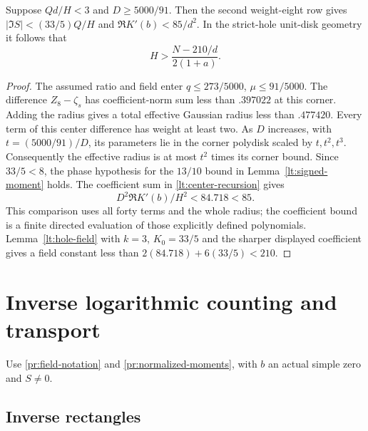 \begin{proposition}\label{lt:W8-field}
Suppose $Qd/H<3$ and $D\ge5000/91$. Then the second weight-eight
row gives $|\Im S|<(33/5)Q/H$ and
$\Re K'(b)<85/d^2$. In the strict-hole unit-disk geometry it follows
that
\begin{equation}\label{lt:field210}
 H>\frac{N-210/d}{2(1+a)}.
\end{equation}
\end{proposition}
\begin{proof}
The assumed ratio and field enter $q\le273/5000$, $\mu\le91/5000$.
The difference $Z_8-\zeta_s$ has coefficient-norm sum less
than $.397022$ at this corner. Adding the radius gives a
total effective Gaussian radius less than $.477420$.
Every term of this center difference has weight at least two.
As $D$ increases, with $t=(5000/91)/D$, its parameters lie in the
corner polydisk scaled by $t,t^2,t^3$. Consequently the effective
radius is at most $t^2$ times its corner bound.
Since $33/5<8$, the phase hypothesis for the $13/10$ bound in
Lemma~\ref{lt:signed-moment} holds. The coefficient sum in
\eqref{lt:center-recursion} gives
\[
 D^2\Re K'(b)/H^2<84.718<85.
\]
This comparison uses all forty terms and the whole radius; the
coefficient bound is a finite directed evaluation of those explicitly
defined polynomials. Lemma~\ref{lt:hole-field} with $k=3$,
$K_0=33/5$ and the sharper displayed coefficient gives a field
constant less than $2(84.718)+6(33/5)<210$.
\end{proof}

\section{Inverse logarithmic counting and transport}\label{sec:inverse-tools}

Use \eqref{pr:field-notation} and \eqref{pr:normalized-moments},
with $b$ an actual simple zero and $S\ne0$.

\subsection{Inverse rectangles}

